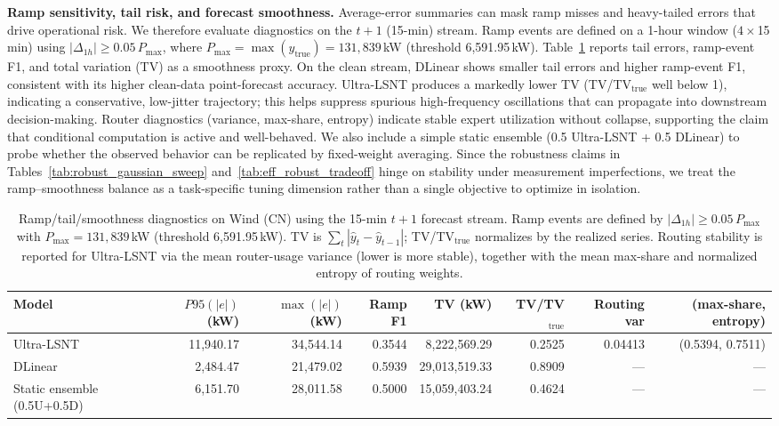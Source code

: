 \documentclass[review,3p,times]{elsarticle}
\begin{document}
\noindent\textbf{Ramp sensitivity, tail risk, and forecast smoothness.}
Average-error summaries can mask ramp misses and heavy-tailed errors that drive operational risk. We therefore evaluate diagnostics on the $t+1$ (15-min) stream. Ramp events are defined on a 1-hour window ($4\times$15\,min) using $|\Delta_{1h}|\ge 0.05\,P_{\max}$, where $P_{\max}=\max(y_{\text{true}})=131{,}839$\,kW (threshold 6{,}591.95\,kW). Table~\ref{tab:ramp_tail_smoothness} reports tail errors, ramp-event F1, and total variation (TV) as a smoothness proxy. On the clean stream, DLinear shows smaller tail errors and higher ramp-event F1, consistent with its higher clean-data point-forecast accuracy. Ultra-LSNT produces a markedly lower TV (TV/TV$_{\text{true}}$ well below 1), indicating a conservative, low-jitter trajectory; this helps suppress spurious high-frequency oscillations that can propagate into downstream decision-making. Router diagnostics (variance, max-share, entropy) indicate stable expert utilization without collapse, supporting the claim that conditional computation is active and well-behaved. We also include a simple static ensemble (0.5 Ultra-LSNT + 0.5 DLinear) to probe whether the observed behavior can be replicated by fixed-weight averaging. Since the robustness claims in Tables~\ref{tab:robust_gaussian_sweep} and~\ref{tab:eff_robust_tradeoff} hinge on stability under measurement imperfections, we treat the ramp--smoothness balance as a task-specific tuning dimension rather than a single objective to optimize in isolation.

\begin{table}[t]
\centering
\caption{Ramp/tail/smoothness diagnostics on Wind (CN) using the 15-min $t+1$ forecast stream. Ramp events are defined by $|\Delta_{1h}|\ge 0.05\,P_{\max}$ with $P_{\max}=131{,}839$\,kW (threshold 6{,}591.95\,kW). TV is $\sum_t | \hat{y}_t-\hat{y}_{t-1} |$; TV/TV$_{\text{true}}$ normalizes by the realized series. Routing stability is reported for Ultra-LSNT via the mean router-usage variance (lower is more stable), together with the mean max-share and normalized entropy of routing weights.}
\label{tab:ramp_tail_smoothness}
\begin{tabular}{lrrrrrrr}
\toprule
Model & $P95(|e|)$ (kW) & $\max(|e|)$ (kW) & Ramp F1 & TV (kW) & TV/TV$_{\text{true}}$ & Routing var & (max-share, entropy) \\
\midrule
Ultra-LSNT & 11,940.17 & 34,544.14 & 0.3544 & 8,222,569.29 & 0.2525 & 0.04413 & (0.5394, 0.7511) \\
DLinear & 2,484.47 & 21,479.02 & 0.5939 & 29,013,519.33 & 0.8909 & --- & --- \\
Static ensemble (0.5U+0.5D) & 6,151.70 & 28,011.58 & 0.5000 & 15,059,403.24 & 0.4624 & --- & --- \\
\bottomrule
\end{tabular}
\end{table}
\end{document}
